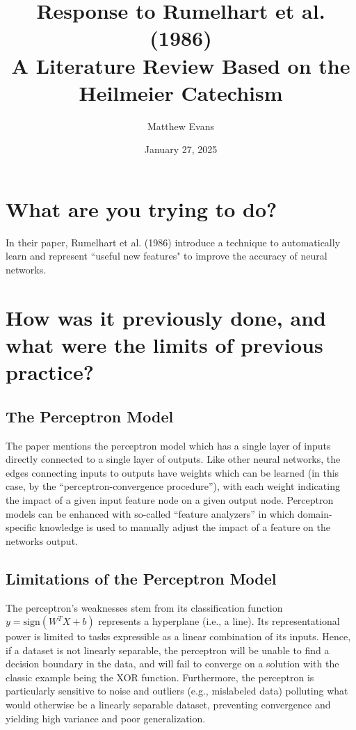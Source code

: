 \documentclass[10pt]{article}
\title{
    Response to Rumelhart et al. (1986) \\
    \large A Literature Review Based on the Heilmeier Catechism
}
\author{Matthew Evans}
\date{January 27, 2025}
\begin{document}
\maketitle

\section*{What are you trying to do?}

In their paper, Rumelhart et al. (1986) introduce a technique to automatically learn and represent ``useful new features" to improve the accuracy of neural networks.



\section*{How was it previously done, and what were the limits of previous practice?}
\subsection*{The Perceptron Model}


The paper mentions the perceptron model which has a single layer of inputs directly connected to a single layer of outputs. Like other neural networks, the edges connecting inputs to outputs have weights which can be learned (in this case, by the ``perceptron-convergence procedure''), with each weight indicating the impact of a given input feature node on a given output node. Perceptron models can be enhanced with so-called ``feature analyzers'' in which domain-specific knowledge is used to manually adjust the impact of a feature on the networks output.

\subsection*{Limitations of the Perceptron Model}

The perceptron's weaknesses stem from its classification function $y = \text{sign}(W^TX+b)$ represents a hyperplane (i.e., a line). Its representational power is limited to tasks expressible as a linear combination of its inputs. Hence, if a dataset is not linearly separable, the perceptron will be unable to find a decision boundary in the data, and will fail to converge on a solution with the classic example being the XOR function. Furthermore, the perceptron is particularly sensitive to noise and outliers (e.g., mislabeled data) polluting what would otherwise be a linearly separable dataset, preventing convergence and yielding high variance and poor generalization.
\end{document}
